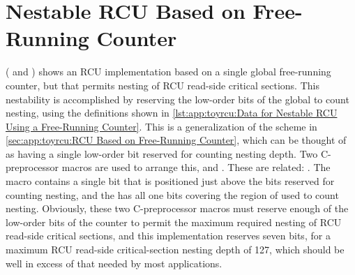 \QuickQuizEnd

\section{Nestable RCU Based on Free-Running Counter}
\label{sec:app:toyrcu:Nestable RCU Based on Free-Running Counter}

( and )
shows an RCU implementation based on a single global free-running counter,
but that permits nesting of RCU read-side critical sections.
This nestability is accomplished by reserving the low-order bits of the
global  to count nesting, using the definitions shown in
\cref{lst:app:toyrcu:Data for Nestable RCU Using a Free-Running Counter}.
This is a generalization of the scheme in
\cref{sec:app:toyrcu:RCU Based on Free-Running Counter},
which can be thought of as having a single low-order bit reserved
for counting nesting depth.
Two C-preprocessor macros are used to arrange this,
 and
.
These are related: .
The  macro contains a single bit that is
positioned just above the bits reserved for counting nesting,
and the  has all one bits covering the
region of  used to count nesting.
Obviously, these two C-preprocessor macros must reserve enough
of the low-order bits of the counter to permit the maximum required
nesting of RCU read-side critical sections, and this implementation
reserves seven bits, for a maximum RCU read-side critical-section
nesting depth of 127, which should be well in excess of that needed
by most applications.

